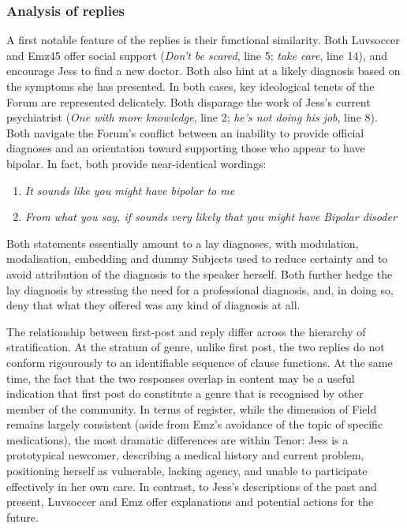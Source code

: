 \documentclass{article}
\begin{document}
{\subsubsection{Analysis of replies} \label{sect:qual-reply-analysis}

A first notable feature of the replies is their functional similarity. Both Luvsoccer and Emz45 offer social support (\emph{Don't be scared}, line 5; \emph{take care}, line 14), and encourage Jess to find a new doctor. Both also hint at a likely diagnosis based on the symptoms she has presented. In both cases, key ideological tenets of the Forum are represented delicately. Both disparage the work of Jess's current psychiatrist (\emph{One with more knowledge}, line 2; \emph{he's not doing his job}, line 8). Both navigate the Forum's conflict between an inability to provide official diagnoses and an orientation toward supporting those who appear to have bipolar. In fact, both provide near-identical wordings:

\begin{enumerate}
\item \emph{It sounds like you might have bipolar to me}
\item \emph{From what you say, if sounds very likely that you might have Bipolar disoder}
\end{enumerate}
%
Both statements essentially amount to a lay diagnoses, with modulation, modalisation, embedding and dummy Subjects used to reduce certainty and to avoid attribution of the diagnosis to the speaker herself. Both further hedge the lay diagnosis by stressing the need for a professional diagnosis, and, in doing so, deny that what they offered was any kind of diagnosis at all.

The relationship between first-post and reply differ across the hierarchy of stratification. At the stratum of genre, unlike first post, the two replies do not conform rigourously to an identifiable sequence of clause functions. At the same time, the fact that the two responses overlap in content may be a useful indication that first post do constitute a genre that is recognised by other member of the community. In terms of register, while the dimension of Field remains largely consistent (aside from Emz's avoidance of the topic of specific medications), the most dramatic differences are within Tenor: Jess is a prototypical newcomer, describing a medical history and current problem, positioning herself as vulnerable, lacking agency, and unable to participate effectively in her own care. In contrast, to Jess's descriptions of the past and present, Luvsoccer and Emz offer explanations and potential actions for the future. 

}
\end{document}
